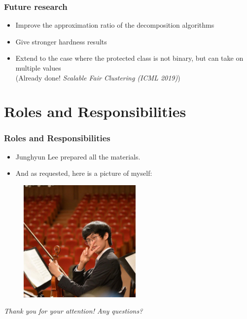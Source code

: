 \documentclass{beamer}
\begin{document}
\begin{frame}
\frametitle{Future research}

\begin{itemize}
	\item Improve the approximation ratio of the decomposition algorithms \pause
	\item Give stronger hardness results \pause
	\item Extend to the case where the protected class is not binary, but can take on multiple values \\
	(Already done! {\it Scalable Fair Clustering (ICML 2019)})
\end{itemize}

\end{frame}



\section{Roles and Responsibilities}

\begin{frame}
\frametitle{Roles and Responsibilities}

\begin{itemize}
\item Junghyun Lee prepared all the materials. \pause
\item And as requested, here is a picture of myself:
\end{itemize}

\begin{figure}[hbt]
  \includegraphics[height=6cm]{facebook_profile_pic.jpg}
  \centering
\end{figure}

\end{frame}




\begin{frame}{}
  \centering \Large
  \emph{Thank you for your attention! Any questions?}
\end{frame}

\end{document}
